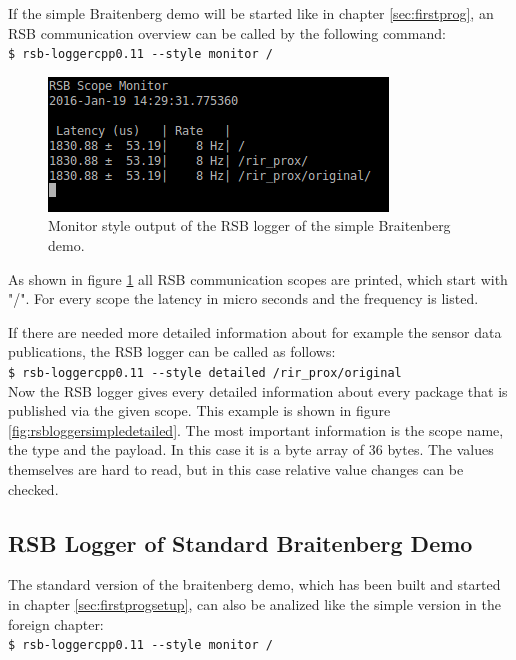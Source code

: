 If the simple Braitenberg demo will be started like in chapter \ref{sec:firstprog}, an RSB communication overview can be called by the following command: \\
{\tt\$ rsb-loggercpp0.11 -{}-style monitor /}

\begin{figure}[htb]
\begin{center}
\includegraphics[scale=0.6]{Bilder/rsbloggerpics/rsb_br_simple_monitor.png}
\caption{Monitor style output of the RSB logger of the simple Braitenberg demo.}
\label{fig:rsbloggersimplemonitor}
\end{center}
\end{figure}

As shown in figure \ref{fig:rsbloggersimplemonitor} all RSB communication scopes are printed, which start with "/". For every scope the latency in micro seconds and the frequency is listed.

If there are needed more detailed information about for example the sensor data publications,  the RSB logger can be called as follows: \\
{\tt\$ rsb-loggercpp0.11 -{}-style detailed /rir\_prox/original} \\
Now the RSB logger gives every detailed information about every package that is published via the given scope. This example is shown in figure \ref{fig:rsbloggersimpledetailed}. The most important information is the scope name, the type and the payload. In this case it is a byte array of 36 bytes. The values themselves are hard to read, but in this case relative value changes can be checked.

\subsection{RSB Logger of Standard Braitenberg Demo}

The standard version of the braitenberg demo, which has been built and started in chapter \ref{sec:firstprogsetup}, can also be analized like the simple version in the foreign chapter: \\
{\tt\$ rsb-loggercpp0.11 -{}-style monitor /}

